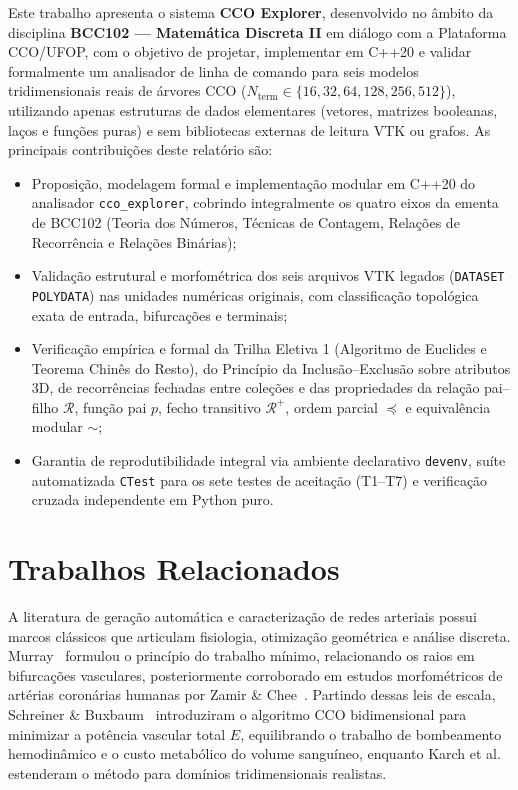 \documentclass[11pt, a4paper]{article}
\begin{document}
Este trabalho apresenta o sistema \textbf{CCO Explorer}, desenvolvido no âmbito da disciplina \textbf{BCC102 --- Matemática Discreta II} em diálogo com a Plataforma CCO/UFOP, com o objetivo de projetar, implementar em C++20 e validar formalmente um analisador de linha de comando para seis modelos tridimensionais reais de árvores CCO ($N_{\mathrm{term}} \in \{16, 32, 64, 128, 256, 512\}$), utilizando apenas estruturas de dados elementares (vetores, matrizes booleanas, laços e funções puras) e sem bibliotecas externas de leitura VTK ou grafos. As principais contribuições deste relatório são:
\begin{itemize}[leftmargin=*]
  \item Proposição, modelagem formal e implementação modular em C++20 do analisador \texttt{cco\_explorer}, cobrindo integralmente os quatro eixos da ementa de BCC102 (Teoria dos Números, Técnicas de Contagem, Relações de Recorrência e Relações Binárias);
  \item Validação estrutural e morfométrica dos seis arquivos VTK legados (\texttt{DATASET POLYDATA}) nas unidades numéricas originais, com classificação topológica exata de entrada, bifurcações e terminais;
  \item Verificação empírica e formal da Trilha Eletiva 1 (Algoritmo de Euclides e Teorema Chinês do Resto), do Princípio da Inclusão--Exclusão sobre atributos 3D, de recorrências fechadas entre coleções e das propriedades da relação pai--filho $\mathcal{R}$, função pai $p$, fecho transitivo $\mathcal{R}^+$, ordem parcial $\preceq$ e equivalência modular $\sim$;
  \item Garantia de reprodutibilidade integral via ambiente declarativo \texttt{devenv}, suíte automatizada \texttt{CTest} para os sete testes de aceitação (T1--T7) e verificação cruzada independente em Python puro.
\end{itemize}

\section{Trabalhos Relacionados}

A literatura de geração automática e caracterização de redes arteriais possui marcos clássicos que articulam fisiologia, otimização geométrica e análise discreta. Murray~\cite{murray1926} formulou o princípio do trabalho mínimo, relacionando os raios em bifurcações vasculares, posteriormente corroborado em estudos morfométricos de artérias coronárias humanas por Zamir \& Chee~\cite{zamir1988}. Partindo dessas leis de escala, Schreiner \& Buxbaum~\cite{schreiner1993} introduziram o algoritmo CCO bidimensional para minimizar a potência vascular total $E$, equilibrando o trabalho de bombeamento hemodinâmico e o custo metabólico do volume sanguíneo, enquanto Karch et al.~\cite{karch1999cco} estenderam o método para domínios tridimensionais realistas.
\end{document}
